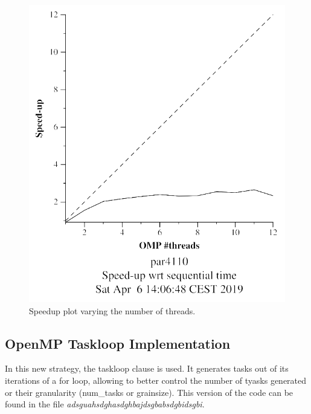 \documentclass[12pt, a4paper]{article}
\begin{document}
\begin{figure}[H]
\begin{minipage}[b]{0.4\linewidth}
  \includegraphics[scale=0.5]{./mandel-omp-10000-strong-23-speedup}
  \caption{Speedup plot varying the number of threads.}
  \label{fig:mandel-omp-10000-strong-23-speedup}
\end{minipage}
\end{figure}

\subsection{OpenMP Taskloop Implementation}

In this new strategy, the taskloop clause is used. It generates tasks out of its iterations of a for loop, allowing to better control the number of tyasks generated or their granularity (num\_tasks or grainsize). This version of the code can be found in the file \textit{adsguahsdghasdghbajdsgbabsdgbidsgbi}.
\end{document}
